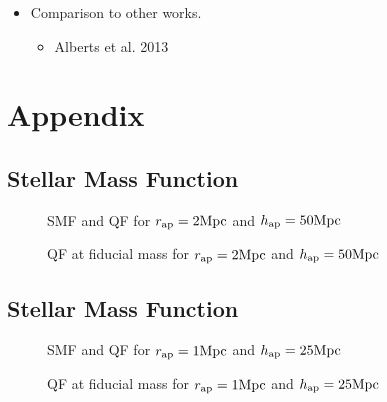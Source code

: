 \documentclass{emulateapj}
\begin{document}
\begin{itemize}
    \item Comparison to other works. 
    \begin{itemize}
        \item Alberts et al. 2013 
    \end{itemize}
\end{itemize}

%
%


\section{Appendix}
\subsection{Stellar Mass Function} \label{sec:smf_const}
\begin{figure*}
    \begin{center}
        \leavevmode
        \label{fig:smf}
        \caption{SMF and QF for $r_{\rm{ap}}=2 \rm{Mpc}$ and $h_{\rm{ap}}=50 \rm{Mpc}$}
    \end{center}
\end{figure*}

\begin{figure*}
    \begin{center}
        \leavevmode
        \label{fig:qf}
        \caption{QF at fiducial mass for $r_{\rm{ap}}=2 \rm{Mpc}$ and $h_{\rm{ap}}=50 \rm{Mpc}$}
    \end{center}
\end{figure*}

\subsection{Stellar Mass Function} \label{sec:smf_const}
\begin{figure*}
    \begin{center}
        \leavevmode
        \label{fig:smf}
        \caption{SMF and QF for $r_{\rm{ap}}=1 \rm{Mpc}$ and $h_{\rm{ap}}=25 \rm{Mpc}$}
    \end{center}
\end{figure*}

\begin{figure*}
    \begin{center}
        \leavevmode
        \label{fig:qf}
        \caption{QF at fiducial mass for $r_{\rm{ap}}=1 \rm{Mpc}$ and $h_{\rm{ap}}=25 \rm{Mpc}$}
    \end{center}
\end{figure*}
\end{document}
